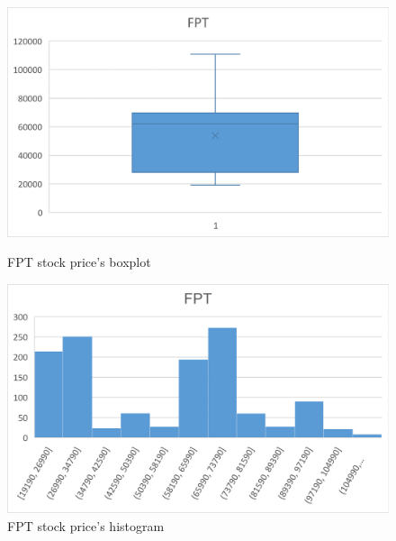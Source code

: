 \documentclass{ieeeojies}
\begin{document}
\begin{figure}[H]
    \centering
    \begin{minipage}{0.23\textwidth}
    \centering
    \includegraphics[width=1\textwidth]{bibliography/Figure/FPT_Quantiles.png}
    \caption{FPT stock price's boxplot}
    \label{fig:1}
    \end{minipage}
    \hfill
    \begin{minipage}{0.23\textwidth}
    \centering
    \includegraphics[width=1\textwidth]{bibliography/Figure/FPT_Bar.png}
    \caption{FPT stock price's histogram}
    \label{fig:2}
    \end{minipage}
\end{figure}
\end{document}
